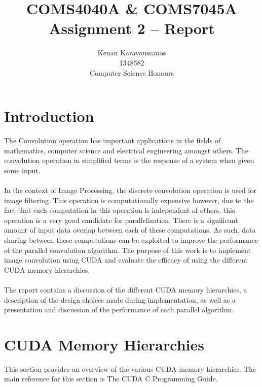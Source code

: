 \documentclass[10pt]{article}
\title{COMS4040A \& COMS7045A \\Assignment 2 -- Report}
\author{Kenan Karavoussanos\\ 1348582\\ Computer Science Honours}
\begin{document}
	
	
	
	\maketitle
	\newpage
	\section{Introduction}
	
	The Convolution operation has important applications in the fields of mathematics, computer science and electrical engineering amongst others. The convolution operation in simplified terms is the response of a system when given some input.
	
	\paragraph{} In the context of Image Processing, the discrete convolution operation is used for image filtering. This operation is computationally expensive however, due to the fact that each computation in this operation is independent of others, this operation is a very good candidate for parallelization. There is a significant amount of input data overlap between each of these computations. As such, data sharing between these computations can be exploited to improve the performance of the parallel convolution algorithm. The purpose of this work is to implement image convolution using CUDA and evaluate the efficacy of using the different CUDA memory hierarchies.  
	
	\paragraph{} The report contains a discussion of the different CUDA memory hierarchies, a description of the design choices made during implementation, as well as a presentation and discussion of the performance of each parallel algorithm.
	
	\section{CUDA Memory Hierarchies}
	This section provides an overview of the various CUDA memory hierarchies. The main reference for this section is The CUDA C Programming Guide\cite{cuda}.
	
\end{document}
